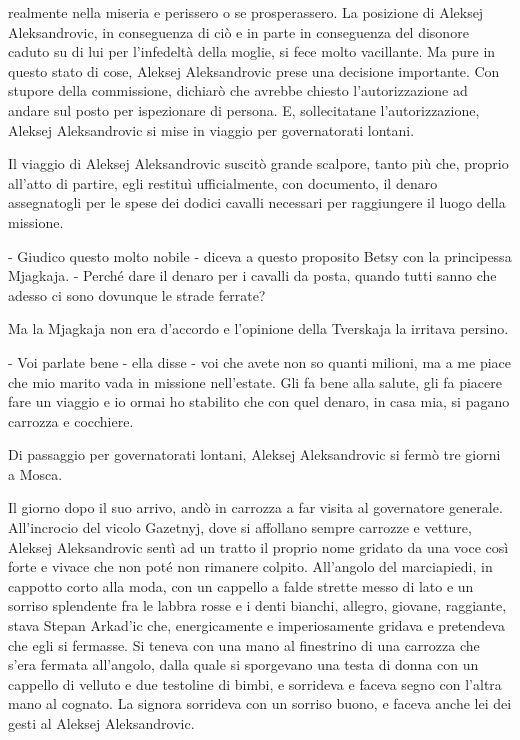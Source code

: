 realmente nella miseria e perissero o se prosperassero. La posizione di Aleksej Aleksandrovic, in conseguenza di ciò e in parte in conseguenza del disonore caduto su di lui per l'infedeltà della moglie, si fece molto vacillante. Ma pure in questo stato di cose, Aleksej Aleksandrovic prese una decisione importante. Con stupore della commissione, dichiarò che avrebbe chiesto l'autorizzazione ad andare sul posto per ispezionare di persona. E, sollecitatane l'autorizzazione, Aleksej Aleksandrovic si mise in viaggio per governatorati lontani. 

Il viaggio di Aleksej Aleksandrovic suscitò grande scalpore, tanto più che, proprio all'atto di partire, egli restituì ufficialmente, con documento, il denaro assegnatogli per le spese dei dodici cavalli necessari per raggiungere il luogo della missione. 

- Giudico questo molto nobile - diceva a questo proposito Betsy con la principessa Mjagkaja. - Perché dare il denaro per i cavalli da posta, quando tutti sanno che adesso ci sono dovunque le strade ferrate? 

Ma la Mjagkaja non era d'accordo e l'opinione della Tverskaja la irritava persino. 

- Voi parlate bene - ella disse - voi che avete non so quanti milioni, ma a me piace che mio marito vada in missione nell'estate. Gli fa bene alla salute, gli fa piacere fare un viaggio e io ormai ho stabilito che con quel denaro, in casa mia, si pagano carrozza e cocchiere. 

Di passaggio per governatorati lontani, Aleksej Aleksandrovic si fermò tre giorni a Mosca. 

Il giorno dopo il suo arrivo, andò in carrozza a far visita al governatore generale. All'incrocio del vicolo Gazetnyj, dove si affollano sempre carrozze e vetture, Aleksej Aleksandrovic sentì ad un tratto il proprio nome gridato da una voce così forte e vivace che non poté non rimanere colpito. All'angolo del marciapiedi, in cappotto corto alla moda, con un cappello a falde strette messo di lato e un sorriso splendente fra le labbra rosse e i denti bianchi, allegro, giovane, raggiante, stava Stepan Arkad'ic che, energicamente e imperiosamente gridava e pretendeva che egli si fermasse. Si teneva con una mano al finestrino di una carrozza che s'era fermata all'angolo, dalla quale si sporgevano una testa di donna con un cappello di velluto e due testoline di bimbi, e sorrideva e faceva segno con l'altra mano al cognato. La signora sorrideva con un sorriso buono, e faceva anche lei dei gesti al Aleksej Aleksandrovic. 

